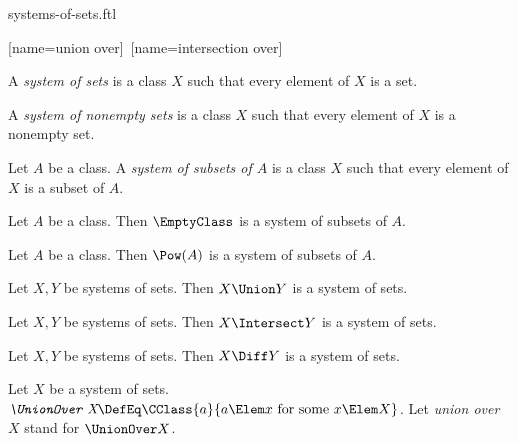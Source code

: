\documentclass{stex}
\begin{document}
\begin{smodule}{systems-of-sets.ftl}


[name=union over]{\bigcup\,}
[name=intersection over]{\bigcap\,}


\begin{definition*}[forthel,for=system of sets]
  A \emph{system of sets} is a class $X$ such that every element of $X$ is a set.
\end{definition*}

\begin{definition*}[forthel,for=system of nonempty sets]
  A \emph{system of nonempty sets} is a class $X$ such that every element of $X$ is a nonempty set.
\end{definition*}

\begin{definition*}[forthel,for=system of subsets]
  Let $A$ be a class.
  A \emph{system of subsets of $A$} is a class $X$ such that every element of $X$ is a subset of $A$.
\end{definition*}

\begin{proposition*}[forthel]
  Let $A$ be a class.
  Then $\EmptyClass$ is a system of subsets of $A$.
\end{proposition*}

\begin{proposition*}[forthel]
  Let $A$ be a class.
  Then $\Pow(A)$ is a system of subsets of $A$.
\end{proposition*}

\begin{proposition*}[forthel]
  Let $X, Y$ be systems of sets.
  Then $X \Union Y$ is a system of sets.
\end{proposition*}

\begin{proposition*}[forthel]
  Let $X, Y$ be systems of sets.
  Then $X \Intersect Y$ is a system of sets.
\end{proposition*}

\begin{proposition*}[forthel]
  Let $X, Y$ be systems of sets.
  Then $X \Diff Y$ is a system of sets.
\end{proposition*}

\begin{definition*}[forthel,for=union over]
  Let $X$ be a system of sets.
  $\emph{\UnionOver X} \DefEq \CClass{a}{a \Elem x\text{ for some }x \Elem X}$.
  Let \emph{union over $X$} stand for $\UnionOver X$.
\end{definition*}


\end{smodule}
\end{document}
